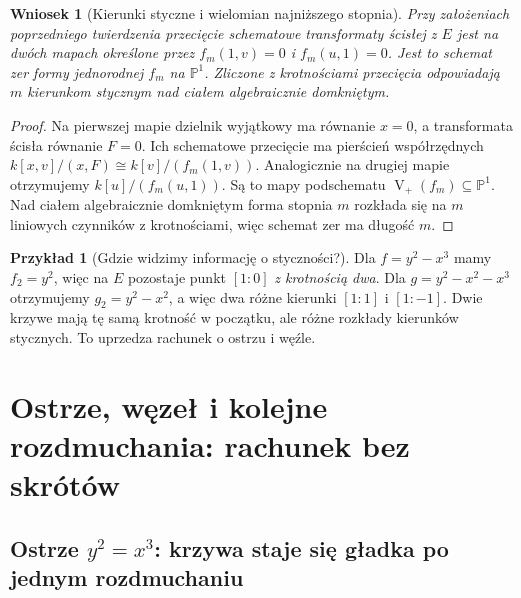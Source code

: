 \documentclass[11pt,a4paper,openany]{report}
\numberwithin{equation}{section}
\theoremstyle{plain}
\newtheorem{wniosek}[twierdzenie]{Wniosek}
\theoremstyle{definition}
\newtheorem{przyklad}[twierdzenie]{Przykład}
\theoremstyle{remark}
\newcommand{\PP}{\mathbb P}
\newcommand{\V}{\operatorname V}
\begin{document}
\begin{wniosek}[Kierunki styczne i wielomian najniższego stopnia]
\label{wn:ga5-tangent-directions}
Przy założeniach poprzedniego twierdzenia
przecięcie schematowe transformaty ścisłej z $E$
jest na dwóch mapach określone przez
$f_m(1,v)=0$ i $f_m(u,1)=0$. Jest to schemat zer
formy jednorodnej $f_m$ na $\PP^1$.
Zliczone z krotnościami przecięcia odpowiadają
$m$ kierunkom stycznym nad ciałem algebraicznie
domkniętym.
\end{wniosek}
\begin{proof}
Na pierwszej mapie dzielnik wyjątkowy ma równanie
$x=0$, a transformata ścisła równanie $F=0$.
Ich schematowe przecięcie ma pierścień współrzędnych
$k[x,v]/(x,F)\cong k[v]/(f_m(1,v))$.
Analogicznie na drugiej mapie otrzymujemy
$k[u]/(f_m(u,1))$. Są to mapy podschematu
$\V_+(f_m)\subseteq\PP^1$. Nad ciałem algebraicznie
domkniętym forma stopnia $m$ rozkłada się na
$m$ liniowych czynników z krotnościami, więc
schemat zer ma długość $m$.
\end{proof}

\begin{przyklad}[Gdzie widzimy informację o styczności?]
Dla $f=y^2-x^3$ mamy $f_2=y^2$, więc na $E$
pozostaje punkt $[1:0]$ \emph{z krotnością dwa}.
Dla $g=y^2-x^2-x^3$ otrzymujemy
$g_2=y^2-x^2$, a więc dwa różne kierunki
$[1:1]$ i $[1:-1]$. Dwie krzywe mają tę samą
krotność w początku, ale różne rozkłady kierunków
stycznych. To uprzedza rachunek o ostrzu i węźle.
\end{przyklad}

\section{Ostrze, węzeł i kolejne rozdmuchania: rachunek bez skrótów}
\label{sec:ga5-cusp-node}

\subsection[Ostrze: wygładzenie po jednym rozdmuchaniu]{Ostrze $y^2=x^3$: krzywa staje się gładka po jednym rozdmuchaniu}
\end{document}
